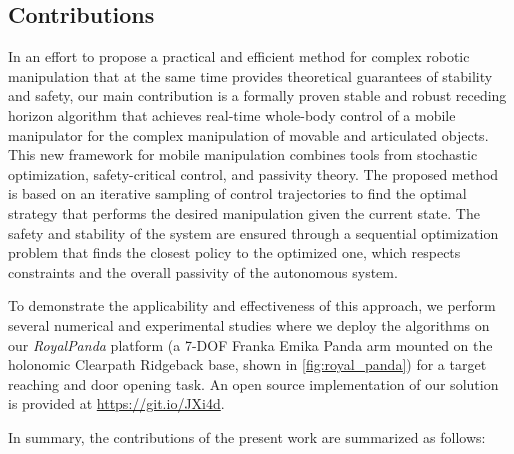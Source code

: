 \subsection{Contributions}
In an effort to propose a practical and efficient method for complex robotic manipulation that at the same time provides theoretical guarantees of stability and safety, our main contribution is a formally proven stable and robust receding horizon algorithm that achieves real-time whole-body control of a mobile manipulator for the complex manipulation of movable and articulated objects.
This new framework for mobile manipulation combines tools from stochastic optimization, safety-critical control, and passivity theory. The proposed method is based on an iterative sampling of control trajectories to find the optimal strategy that performs the desired manipulation given the current state. The safety and stability of the system are ensured through a sequential optimization problem that finds the closest policy to the optimized one, which respects constraints and the overall passivity of the autonomous system. 


To demonstrate the applicability and effectiveness of this approach, we perform several numerical and experimental studies where we deploy the algorithms on our \textit{RoyalPanda} platform (a 7-DOF Franka Emika Panda arm mounted on the holonomic Clearpath Ridgeback base, shown in \fig\ref{fig:royal_panda}) for a target reaching and door opening task. An open source implementation of our solution is provided at \url{https://git.io/JXi4d}.

In summary, the contributions of the present work are summarized as follows:
\ifreview
{}
\fi

